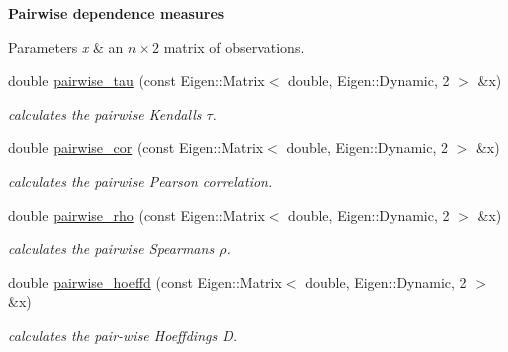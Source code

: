 \begin{Indent}{\bf Pairwise dependence measures}\par
{\em 
\begin{DoxyParams}{Parameters}
{\em x} & an $ n \times 2 $ matrix of observations. \\
\hline
\end{DoxyParams}
}\begin{DoxyCompactItemize}
\item 
double \hyperlink{namespacevinecopulib_1_1tools__stats_a8530da1bb8eb0f8a25eb86b6574bed02}{pairwise\+\_\+tau} (const Eigen\+::\+Matrix$<$ double, Eigen\+::\+Dynamic, 2 $>$ \&x)\hypertarget{namespacevinecopulib_1_1tools__stats_a8530da1bb8eb0f8a25eb86b6574bed02}{}\label{namespacevinecopulib_1_1tools__stats_a8530da1bb8eb0f8a25eb86b6574bed02}

\begin{DoxyCompactList}\small\item\em calculates the pairwise Kendall\textquotesingle{}s $ \tau $. \end{DoxyCompactList}\item 
double \hyperlink{namespacevinecopulib_1_1tools__stats_ad076513f9a531a015bb0eaff098a8271}{pairwise\+\_\+cor} (const Eigen\+::\+Matrix$<$ double, Eigen\+::\+Dynamic, 2 $>$ \&x)\hypertarget{namespacevinecopulib_1_1tools__stats_ad076513f9a531a015bb0eaff098a8271}{}\label{namespacevinecopulib_1_1tools__stats_ad076513f9a531a015bb0eaff098a8271}

\begin{DoxyCompactList}\small\item\em calculates the pairwise Pearson correlation. \end{DoxyCompactList}\item 
double \hyperlink{namespacevinecopulib_1_1tools__stats_aa5cb9d201eef90b94024e5d354ac8174}{pairwise\+\_\+rho} (const Eigen\+::\+Matrix$<$ double, Eigen\+::\+Dynamic, 2 $>$ \&x)\hypertarget{namespacevinecopulib_1_1tools__stats_aa5cb9d201eef90b94024e5d354ac8174}{}\label{namespacevinecopulib_1_1tools__stats_aa5cb9d201eef90b94024e5d354ac8174}

\begin{DoxyCompactList}\small\item\em calculates the pairwise Spearman\textquotesingle{}s $ \rho $. \end{DoxyCompactList}\item 
double \hyperlink{namespacevinecopulib_1_1tools__stats_a2dae5e063461728f92eae5e6e346fdd3}{pairwise\+\_\+hoeffd} (const Eigen\+::\+Matrix$<$ double, Eigen\+::\+Dynamic, 2 $>$ \&x)\hypertarget{namespacevinecopulib_1_1tools__stats_a2dae5e063461728f92eae5e6e346fdd3}{}\label{namespacevinecopulib_1_1tools__stats_a2dae5e063461728f92eae5e6e346fdd3}

\begin{DoxyCompactList}\small\item\em calculates the pair-\/wise Hoeffding\textquotesingle{}s D. \end{DoxyCompactList}\end{DoxyCompactItemize}
\end{Indent}



